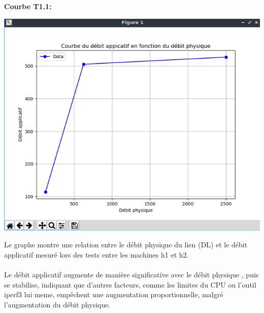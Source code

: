 \textbf{Courbe T1.1:} 
\begin{center}
    \includegraphics[width=1\textwidth]{./images/GrapheTest1.png} \\
\end{center}
Le graphe montre une relation entre le débit physique du lien (DL) et le débit applicatif mesuré lors des tests entre les machines h1 et h2.
\\
\\Le débit applicatif augmente de manière significative avec le débit physique , puis se stabilise, indiquant que d'autres facteurs, comme les limites du CPU ou l'outil iperf3 lui meme, empêchent une augmentation proportionnelle, malgré l'augmentation du débit physique.
